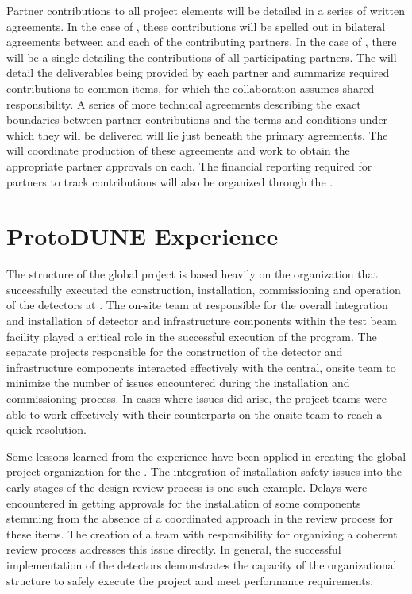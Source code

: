 Partner contributions to all project elements will be detailed in a
series of written agreements.  In the case of , these
contributions will be spelled out in bilateral agreements between
 and each of the contributing partners.  In the case of
, there will be a single  
detailing the contributions of all participating partners.  The  
will detail the deliverables being provided by each partner and
summarize required contributions to common items, for which the
collaboration assumes shared responsibility.  A series of more
technical agreements describing the exact boundaries between partner
contributions and the terms and conditions under which they will be
delivered will lie just beneath the primary agreements.  The
 will coordinate production of these agreements and work to
obtain the appropriate partner approvals %
on each.  The financial
reporting required for partners to track  contributions
will also be organized through the .

\section{ProtoDUNE Experience}
\label{sec:dune_protodune}

The structure of the global project is based heavily on the
organization that successfully executed the construction,
installation, commissioning and operation of the 
detectors at .  The on-site team at  responsible for the
overall integration and installation of detector and infrastructure
components within the test beam facility played a critical role in the
successful execution of the  program.  The separate
projects responsible for the construction of the detector and
infrastructure components interacted effectively with the central,
onsite team to minimize the number of issues encountered during the
installation and commissioning process.  In cases where issues did
arise, the project teams were able to work effectively with their
counterparts on the onsite team to reach a quick resolution.

Some lessons learned from the  experience have been
applied in creating the global project organization for the  .  The integration of installation safety issues into the
early stages of the design review process is one such example.  Delays
were encountered in getting approvals for the installation of some
  components stemming from the absence of a %
coordinated approach in the review process for these items.  The
creation of a  team with responsibility for organizing a
coherent review process addresses this issue directly.  In general,
the successful implementation of the  detectors
demonstrates the capacity of the organizational structure to safely
execute the project and meet performance requirements.
